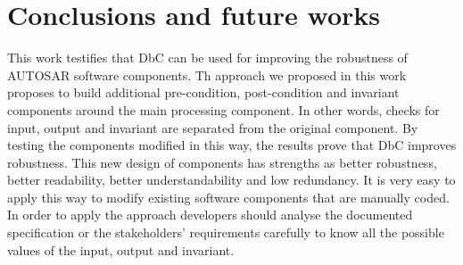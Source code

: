 \section{Conclusions and future works}\label{sec:conclusions}

This work testifies that DbC can be used for improving the robustness of AUTOSAR software components. %
Th approach we proposed in this work %
proposes to build additional pre-condition, post-condition and invariant components around the main processing component. In other words, checks for input, output and invariant are separated from the original component. By testing the components modified in this way, the results prove that DbC improves robustness. This new design of components has strengths as better robustness, better readability, better understandability and low redundancy. It is very easy to apply this way to modify existing software components that are manually coded. %
In order to apply the approach developers should analyse the documented specification or the stakeholders' requirements carefully to know all the possible values of the input, output and invariant. %



